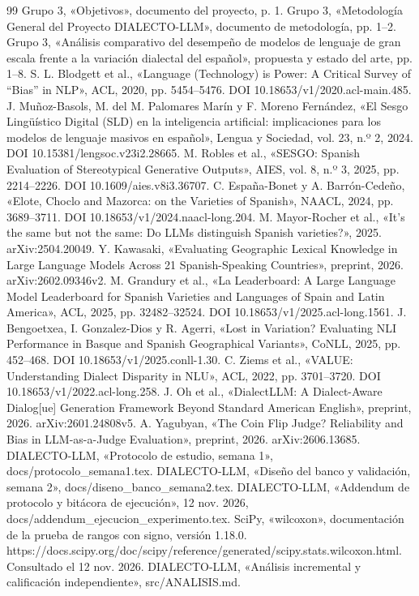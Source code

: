 \documentclass[conference]{IEEEtran}
\begin{document}
\begin{thebibliography}{99}
 Grupo 3, «Objetivos», documento del proyecto, p. 1.
 Grupo 3, «Metodología General del Proyecto DIALECTO-LLM», documento de metodología, pp. 1--2.
 Grupo 3, «Análisis comparativo del desempeño de modelos de lenguaje de gran escala frente a la variación dialectal del español», propuesta y estado del arte, pp. 1--8.
 S. L. Blodgett et al., «Language (Technology) is Power: A Critical Survey of “Bias” in NLP», ACL, 2020, pp. 5454--5476. DOI 10.18653/v1/2020.acl-main.485.
 J. Muñoz-Basols, M. del M. Palomares Marín y F. Moreno Fernández, «El Sesgo Lingüístico Digital (SLD) en la inteligencia artificial: implicaciones para los modelos de lenguaje masivos en español», Lengua y Sociedad, vol. 23, n.º 2, 2024. DOI 10.15381/lengsoc.v23i2.28665.
 M. Robles et al., «SESGO: Spanish Evaluation of Stereotypical Generative Outputs», AIES, vol. 8, n.º 3, 2025, pp. 2214--2226. DOI 10.1609/aies.v8i3.36707.
 C. España-Bonet y A. Barrón-Cedeño, «Elote, Choclo and Mazorca: on the Varieties of Spanish», NAACL, 2024, pp. 3689--3711. DOI 10.18653/v1/2024.naacl-long.204.
 M. Mayor-Rocher et al., «It's the same but not the same: Do LLMs distinguish Spanish varieties?», 2025. arXiv:2504.20049.
 Y. Kawasaki, «Evaluating Geographic Lexical Knowledge in Large Language Models Across 21 Spanish-Speaking Countries», preprint, 2026. arXiv:2602.09346v2.
 M. Grandury et al., «La Leaderboard: A Large Language Model Leaderboard for Spanish Varieties and Languages of Spain and Latin America», ACL, 2025, pp. 32482--32524. DOI 10.18653/v1/2025.acl-long.1561.
 J. Bengoetxea, I. Gonzalez-Dios y R. Agerri, «Lost in Variation? Evaluating NLI Performance in Basque and Spanish Geographical Variants», CoNLL, 2025, pp. 452--468. DOI 10.18653/v1/2025.conll-1.30.
 C. Ziems et al., «VALUE: Understanding Dialect Disparity in NLU», ACL, 2022, pp. 3701--3720. DOI 10.18653/v1/2022.acl-long.258.
 J. Oh et al., «DialectLLM: A Dialect-Aware Dialog[ue] Generation Framework Beyond Standard American English», preprint, 2026. arXiv:2601.24808v5.
 A. Yagubyan, «The Coin Flip Judge? Reliability and Bias in LLM-as-a-Judge Evaluation», preprint, 2026. arXiv:2606.13685.
 DIALECTO-LLM, «Protocolo de estudio, semana 1», docs/protocolo\_semana1.tex.
 DIALECTO-LLM, «Diseño del banco y validación, semana 2», docs/diseno\_banco\_semana2.tex.
 DIALECTO-LLM, «Addendum de protocolo y bitácora de ejecución», 12 nov. 2026, docs/addendum\_ejecucion\_experimento.tex.
 SciPy, «wilcoxon», documentación de la prueba de rangos con signo, versión 1.18.0. https://docs.scipy.org/doc/scipy/reference/generated/scipy.stats.wilcoxon.html. Consultado el 12 nov. 2026.
 DIALECTO-LLM, «Análisis incremental y calificación independiente», src/ANALISIS.md.
\end{thebibliography}
\end{document}
